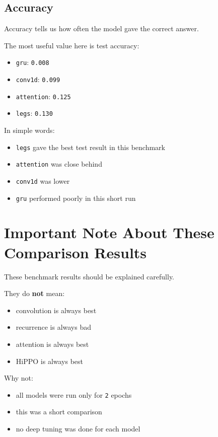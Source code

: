 \documentclass[12pt]{article}
\begin{document}
\subsection*{Accuracy}

Accuracy tells us how often the model gave the correct answer.

The most useful value here is test accuracy:

\begin{itemize}
    \item \texttt{gru}: \texttt{0.008}
    \item \texttt{conv1d}: \texttt{0.099}
    \item \texttt{attention}: \texttt{0.125}
    \item \texttt{legs}: \texttt{0.130}
\end{itemize}

In simple words:

\begin{itemize}
    \item \texttt{legs} gave the best test result in this benchmark
    \item \texttt{attention} was close behind
    \item \texttt{conv1d} was lower
    \item \texttt{gru} performed poorly in this short run
\end{itemize}

\section*{Important Note About These Comparison Results}

These benchmark results should be explained carefully.

They do \textbf{not} mean:

\begin{itemize}
    \item convolution is always best
    \item recurrence is always bad
    \item attention is always best
    \item HiPPO is always best
\end{itemize}

Why not:

\begin{itemize}
    \item all models were run only for \texttt{2} epochs
    \item this was a short comparison
    \item no deep tuning was done for each model
\end{itemize}
\end{document}
